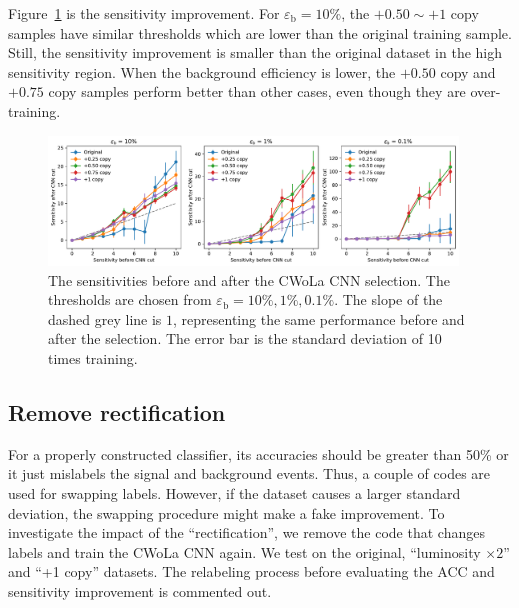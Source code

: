 \documentclass[12pt]{article}
\begin{document}
		Figure~\ref{fig:sensitivity_improvement_bkg_eff_copy_ratio} is the sensitivity improvement. For $\varepsilon_{\text{b}} = 10\%$, the $+ 0.50 \sim +1$ copy samples have similar thresholds which are lower than the original training sample. Still, the sensitivity improvement is smaller than the original dataset in the high sensitivity region. When the background efficiency is lower, the $+ 0.50$ copy and $+ 0.75$ copy samples perform better than other cases, even though they are over-training. 
		\begin{figure}[htpb]
			\centering
			\includegraphics[width=0.97\textwidth]{HVmodel_sensitivity_improvement_bkg_eff_copy_ratio.pdf}
			\caption{The sensitivities before and after the CWoLa CNN selection. The thresholds are chosen from $\varepsilon_{\text{b}} = 10\%, 1\%, 0.1\%$. The slope of the dashed grey line is $1$, representing the same performance before and after the selection. The error bar is the standard deviation of 10 times training.}
			\label{fig:sensitivity_improvement_bkg_eff_copy_ratio}
		\end{figure}
	\subsection{Remove rectification}%
	\label{sub:remove_rectification}
		For a properly constructed classifier, its accuracies should be greater than 50\% or it just mislabels the signal and background events.	Thus, a couple of codes are used for swapping labels. However, if the dataset causes a larger standard deviation, the swapping procedure might make a fake improvement. To investigate the impact of the ``rectification'', we remove the code that changes labels and train the CWoLa CNN again. We test on the original, ``luminosity $\times 2$'' and ``+1 copy'' datasets. The relabeling process before evaluating the ACC and sensitivity improvement is commented out.
\end{document}

